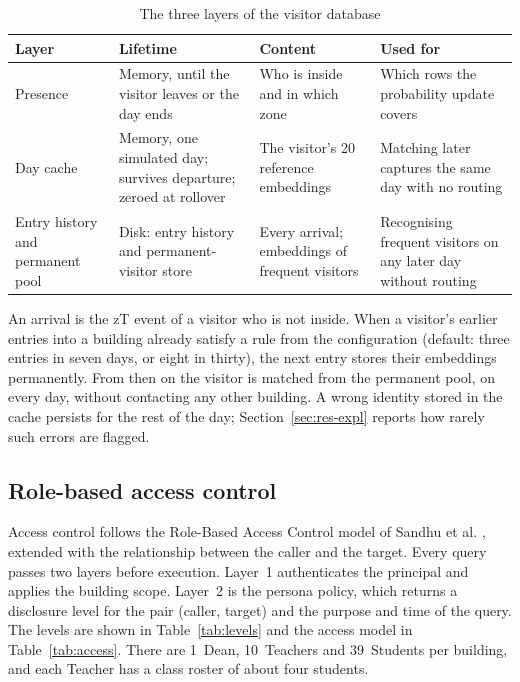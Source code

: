 \documentclass[12pt,a4paper,oneside]{report}
\begin{document}
\begin{table}[htbp]
\centering
\caption{The three layers of the visitor database}\label{tab:visitor}
{\small\setlength{\tabcolsep}{4pt}\renewcommand{\arraystretch}{1.2}
\begin{tabular}{|p{2.68cm}|p{3.83cm}|p{3.64cm}|p{3.83cm}|}\hline
\textbf{Layer} & \textbf{Lifetime} & \textbf{Content} & \textbf{Used for}\\\hline
Presence & Memory, until the visitor leaves or the day ends & Who is inside and in which zone & Which rows the probability update covers\\\hline
Day cache & Memory, one simulated day; survives departure; zeroed at rollover & The visitor's 20 reference embeddings & Matching later captures the same day with no routing\\\hline
Entry history and permanent pool & Disk: entry history and permanent-visitor store & Every arrival; embeddings of frequent visitors & Recognising frequent visitors on any later day without routing\\\hline
\end{tabular}}
\end{table}

An arrival is the zT event of a visitor who is not inside. When a visitor's earlier entries into a building already satisfy a rule from the configuration (default: three entries in seven days, or eight in thirty), the next entry stores their embeddings permanently. From then on the visitor is matched from the permanent pool, on every day, without contacting any other building. A wrong identity stored in the cache persists for the rest of the day; Section~\ref{sec:res-expl} reports how rarely such errors are flagged.

\subsection{Role-based access control}
Access control follows the Role-Based Access Control model of Sandhu et al. \cite{ref21}, extended with the relationship between the caller and the target. Every query passes two layers before execution. Layer~1 authenticates the principal and applies the building scope. Layer~2 is the persona policy, which returns a disclosure level for the pair (caller, target) and the purpose and time of the query. The levels are shown in Table~\ref{tab:levels} and the access model in Table~\ref{tab:access}. There are 1~Dean, 10~Teachers and 39~Students per building, and each Teacher has a class roster of about four students.
\end{document}

